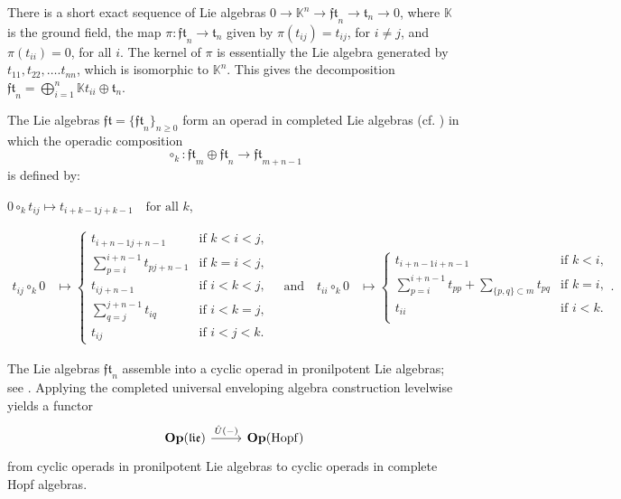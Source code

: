 \documentclass{amsart}
\newcommand{\kk}{\mathbb{K}}    %
\newcommand{\Op}{\mathbf{Op}}
\newcommand{\lrar}{\ensuremath{\longrightarrow}}
\newcommand{\ft}{\mathfrak{t}}
\newcommand{\fft}{\mathfrak{ft}}
\theoremstyle{definition}
\numberwithin{equation}{section}
\begin{document}
There is a short exact sequence of Lie algebras $0 \lrar \kk^{n} \lrar \fft_{n} \lrar \ft_{n} \lrar 0$, where $\kk$ is the ground field, the map $\pi: \fft_{n} \lrar \ft_{n}$ given by $\pi(t_{ij}) = t_{ij}$, for $i \neq j$, and $\pi(t_{ii}) = 0$, for all $i$. The kernel of $\pi$ is essentially the Lie algebra generated by $t_{11}, t_{22}, \dots. t_{nn}$, which is isomorphic to $\kk^{n}$. This gives the  decomposition $ \fft_{n} = \bigoplus_{i=1}^{n} \kk t_{ii} \oplus \ft_{n}$. 

The Lie algebras $\mathfrak{ft}=\{\mathfrak{ft}_n\}_{n\geq 0}$ form an operad in completed Lie algebras (cf. \cite[Section 1.3]{severa2009formality}) in which the operadic composition \[\circ_k : \mathfrak{ft}_m \oplus \mathfrak{ft}_n \lrar \mathfrak{ft}_{m+n-1}\] is defined by: 
\begin{center}
    $0 \circ_k t_{ij} \mapsto t_{i+k-1 j+k-1} \quad \text{for all } k$,
\end{center}
\begin{equation*}
\begin{matrix} 
t_{ij} \circ_k 0 &\mapsto
\begin{cases}
t_{i+n-1 j+n-1 } & \text{if } k<i<j, \\
\sum_{p = i}^{i+n-1} t_{pj+n-1} & \text{if } k =i <j,\\
t_{i j+n-1} & \text{if } i < k <j,\\ 
\sum_{q = j}^{j+n-1} t_{iq} & \text{if } i < k =j,\\ 
t_{ij} & \text{if } i < j < k.
\end{cases} \quad \text{and} \quad
t_{ii} \circ_k 0 &\mapsto 
\begin{cases}
    t_{i+n-1 i+n-1 } & \text{if } k< i,\\ 
    \sum_{p = i}^{i+n-1} t_{pp} + \sum_{\{p,q\}\subset m} t_{pq} & \text{if } k =i,\\
    t_{ii} & \text{if } i < k.\\ 
\end{cases}.
\end{matrix} 
\end{equation*}

The Lie algebras \(\mathfrak{ft}_n\) assemble into a cyclic operad in pronilpotent Lie algebras; see \cite[Section~5.1]{willwacher2024cyclic}. Applying the completed universal enveloping algebra construction levelwise yields a functor \[\begin{tikzcd} \Op(\mathfrak{lie})\arrow[r, "\hat{U}(-)"] & \Op(\operatorname{Hopf})\end{tikzcd}\] from cyclic operads in pronilpotent Lie algebras to cyclic operads in complete Hopf algebras.
\end{document}
